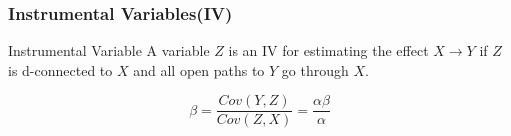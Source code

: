 \documentclass{beamer}
\begin{document}

\begin{frame}
	\frametitle{Instrumental Variables(IV)}
	\begin{block}{Instrumental Variable}
		A variable $ Z $ is an IV for estimating the effect $ X \rightarrow Y $
		if $ Z $ is d-connected to $ X $ and all open paths to $ Y $ go through
		$ X $.
	\end{block}
	\begin{figure}
		\centering
		\begin{subfigure}{0.5\linewidth}
		\end{subfigure}%
		\begin{subfigure}{0.5\linewidth}
			$$ \beta = \frac{Cov(Y, Z)}{Cov(Z, X)} = \frac{\alpha \beta}{\alpha}$$
		\end{subfigure}
	\end{figure}
\end{frame}
\end{document}
